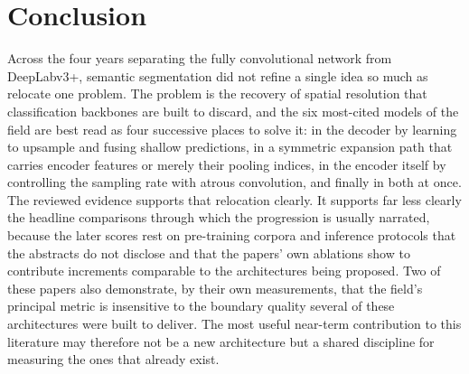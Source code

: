 \documentclass[journal]{IEEEtran}
\begin{document}
\section{Conclusion}
\label{sec:conclusion}
Across the four years separating the fully convolutional network from DeepLabv3+,
semantic segmentation did not refine a single idea so much as relocate one problem.
The problem is the recovery of spatial resolution that classification backbones are
built to discard, and the six most-cited models of the field are best read as four
successive places to solve it: in the decoder by learning to upsample and fusing
shallow predictions, in a symmetric expansion path that carries encoder features or
merely their pooling indices, in the encoder itself by controlling the sampling rate
with atrous convolution, and finally in both at once. The reviewed evidence supports
that relocation clearly. It supports far less clearly the headline comparisons through
which the progression is usually narrated, because the later scores rest on
pre-training corpora and inference protocols that the abstracts do not disclose and
that the papers' own ablations show to contribute increments comparable to the
architectures being proposed. Two of these papers also demonstrate, by their own
measurements, that the field's principal metric is insensitive to the boundary quality
several of these architectures were built to deliver. The most useful near-term
contribution to this literature may therefore not be a new architecture but a shared
discipline for measuring the ones that already exist.





%
\end{document}
